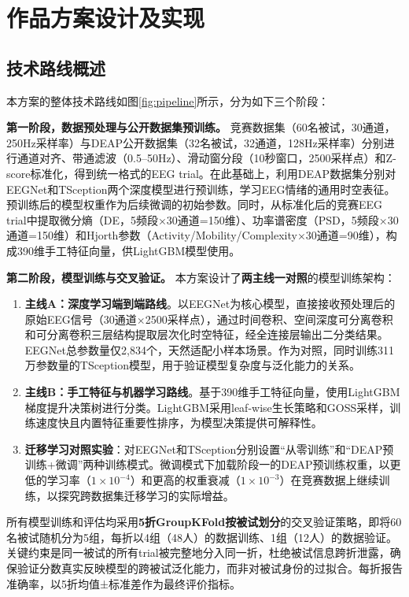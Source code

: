 \documentclass[UTF8,zihao=-4,fontset=windows]{ctexart}
\numberwithin{equation}{section}
\numberwithin{figure}{section}
\numberwithin{table}{section}
\begin{document}
\section{作品方案设计及实现}

\subsection{技术路线概述}

本方案的整体技术路线如图\ref{fig:pipeline}所示，分为如下三个阶段：

\textbf{第一阶段，数据预处理与公开数据集预训练。} 竞赛数据集（60名被试，30通道，250Hz采样率）与DEAP公开数据集（32名被试，32通道，128Hz采样率）分别进行通道对齐、带通滤波（0.5--50Hz）、滑动窗分段（10秒窗口，2500采样点）和Z-score标准化，得到统一格式的EEG trial。在此基础上，利用DEAP数据集分别对EEGNet和TSception两个深度模型进行预训练，学习EEG情绪的通用时空表征。预训练后的模型权重作为后续微调的初始参数。同时，从标准化后的竞赛EEG trial中提取微分熵（DE，5频段×30通道=150维）、功率谱密度（PSD，5频段×30通道=150维）和Hjorth参数（Activity/Mobility/Complexity×30通道=90维），构成390维手工特征向量，供LightGBM模型使用。

\textbf{第二阶段，模型训练与交叉验证。} 本方案设计了\textbf{两主线一对照}的模型训练架构：

\begin{enumerate}[label={(\arabic*)}, labelindent=2em, leftmargin=4.5em, itemindent=0pt, labelsep=0.5em]
    \item \textbf{主线A：深度学习端到端路线}。以EEGNet为核心模型，直接接收预处理后的原始EEG信号（30通道×2500采样点），通过时间卷积、空间深度可分离卷积和可分离卷积三层结构提取层次化时空特征，经全连接层输出二分类结果。EEGNet总参数量仅2,834个，天然适配小样本场景。作为对照，同时训练311万参数量的TSception模型，用于验证模型复杂度与泛化能力的关系。
    \item \textbf{主线B：手工特征与机器学习路线}。基于390维手工特征向量，使用LightGBM梯度提升决策树进行分类。LightGBM采用leaf-wise生长策略和GOSS采样，训练速度快且内置特征重要性排序，为模型决策提供可解释性。
    \item \textbf{迁移学习对照实验}：对EEGNet和TSception分别设置``从零训练''和``DEAP预训练+微调''两种训练模式。微调模式下加载阶段一的DEAP预训练权重，以更低的学习率（$1\times10^{-4}$）和更高的权重衰减（$1\times10^{-3}$）在竞赛数据上继续训练，以探究跨数据集迁移学习的实际增益。
\end{enumerate}

所有模型训练和评估均采用\textbf{5折GroupKFold按被试划分}的交叉验证策略，即将60名被试随机分为5组，每折以4组（48人）的数据训练、1组（12人）的数据验证。关键约束是同一被试的所有trial被完整地分入同一折，杜绝被试信息跨折泄露，确保验证分数真实反映模型的跨被试泛化能力，而非对被试身份的过拟合。每折报告准确率，以5折均值±标准差作为最终评价指标。
\end{document}
